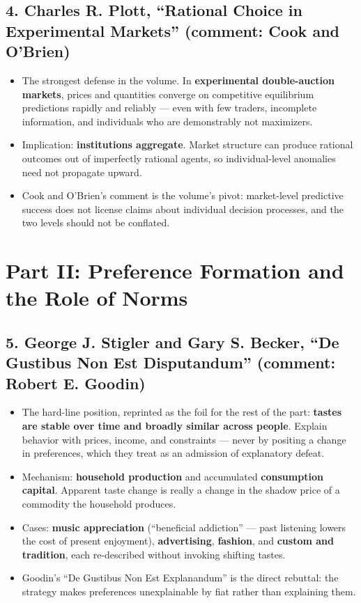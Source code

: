 \documentclass[12pt]{article}
\begin{document}
\subsection*{4. Charles R. Plott, ``Rational Choice in Experimental Markets'' (comment: Cook and O'Brien)}
\begin{itemize}[leftmargin=*, itemsep=3pt]
    \item The strongest defense in the volume. In \textbf{experimental
    double-auction markets}, prices and quantities converge on competitive
    equilibrium predictions rapidly and reliably --- even with few traders,
    incomplete information, and individuals who are demonstrably not
    maximizers.
    \item Implication: \textbf{institutions aggregate}. Market structure can
    produce rational outcomes out of imperfectly rational agents, so
    individual-level anomalies need not propagate upward.
    \item Cook and O'Brien's comment is the volume's pivot: market-level
    predictive success does not license claims about individual decision
    processes, and the two levels should not be conflated.
\end{itemize}

\section{Part II: Preference Formation and the Role of Norms}

\subsection*{5. George J. Stigler and Gary S. Becker, ``De Gustibus Non Est Disputandum'' (comment: Robert E. Goodin)}
\begin{itemize}[leftmargin=*, itemsep=3pt]
    \item The hard-line position, reprinted as the foil for the rest of the
    part: \textbf{tastes are stable over time and broadly similar across
    people}. Explain behavior with prices, income, and constraints --- never by
    positing a change in preferences, which they treat as an admission of
    explanatory defeat.
    \item Mechanism: \textbf{household production} and accumulated
    \textbf{consumption capital}. Apparent taste change is really a change in
    the shadow price of a commodity the household produces.
    \item Cases: \textbf{music appreciation} (``beneficial addiction'' --- past
    listening lowers the cost of present enjoyment), \textbf{advertising},
    \textbf{fashion}, and \textbf{custom and tradition}, each re-described
    without invoking shifting tastes.
    \item Goodin's ``De Gustibus Non Est Explanandum'' is the direct rebuttal:
    the strategy makes preferences unexplainable by fiat rather than
    explaining them.
\end{itemize}
\end{document}

